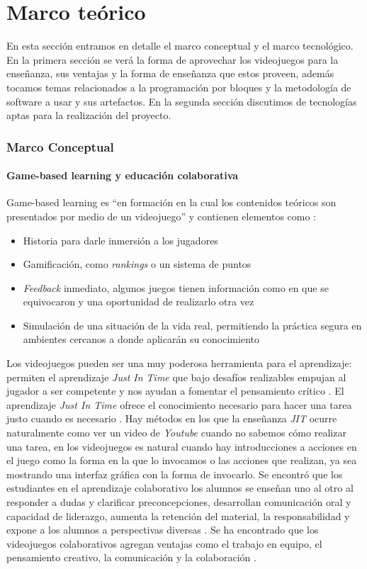 \chapter{Marco teórico}
En esta sección entramos en detalle el marco conceptual y el marco tecnológico. En la primera sección se verá la forma de aprovechar los videojuegos para la enseñanza, sus ventajas y la forma de enseñanza que estos proveen, además tocamos temas relacionados a la programación por bloques y la metodología de software a usar y sus artefactos. En la segunda sección discutimos de tecnologías aptas para la realización del proyecto.

\subsection{Marco Conceptual}
\subsubsection{Game-based learning y educación colaborativa}
Game-based learning es “en formación en la cual los contenidos teóricos son presentados por medio de un videojuego” \cite{gamelearn2014a} y contienen elementos como \cite{gamelearn2017a}:
\begin{itemize}
    \item Historia para darle inmersión a los jugadores
    \item Gamificación, como \textit{rankings} o un sistema de puntos
    \item \textit{Feedback} inmediato, algunos juegos tienen información como en que se equivocaron y una oportunidad de realizarlo otra vez
    \item Simulación de una situación de la vida real, permitiendo la práctica segura en ambientes cercanos a donde aplicarán su conocimiento
\end{itemize}

Los videojuegos pueden ser una muy poderosa herramienta para el aprendizaje: permiten el aprendizaje \textit{Just In Time} que bajo desafíos realizables empujan al 
jugador a ser competente y nos ayudan a fomentar el pensamiento crítico \cite{levasseur-a}. 
El aprendizaje \textit{Just In Time} ofrece el conocimiento necesario para hacer una tarea justo cuando es necesario \cite{unknown2017a}. 
Hay métodos en los que la enseñanza \textit{JIT} ocurre naturalmente como ver un video de \textit{Youtube} cuando no sabemos cómo realizar una tarea, 
en los videojuegos es natural cuando hay introducciones a acciones en el juego como la forma en la que lo invocamos o las acciones que realizan, 
ya sea mostrando una interfaz gráfica con la forma de invocarlo.
Se encontró que los estudiantes en el aprendizaje colaborativo los alumnos se enseñan uno al otro al responder a dudas y 
clarificar preconcepciones, desarrollan comunicación oral y capacidad de liderazgo, aumenta la retención del material, 
la responsabilidad y expone a los alumnos a perspectivas diversas \cite{university-a}.
Se ha encontrado que los videojuegos colaborativos agregan ventajas como el trabajo en equipo, el pensamiento creativo, 
la comunicación y la colaboración \cite{romano-a}.

